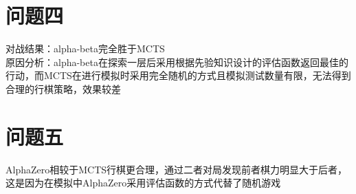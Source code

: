 \documentclass[12pt,a4paper]{article}
\begin{document}
\section*{问题四}
对战结果：alpha-beta完全胜于MCTS\\
原因分析：alpha-beta在探索一层后采用根据先验知识设计的评估函数返回最佳的行动，而MCTS在进行模拟时采用完全随机的方式且模拟测试数量有限，无法得到合理的行棋策略，效果较差
\section*{问题五}
AlphaZero相较于MCTS行棋更合理，通过二者对局发现前者棋力明显大于后者，这是因为在模拟中AlphaZero采用评估函数的方式代替了随机游戏
\end{document}
